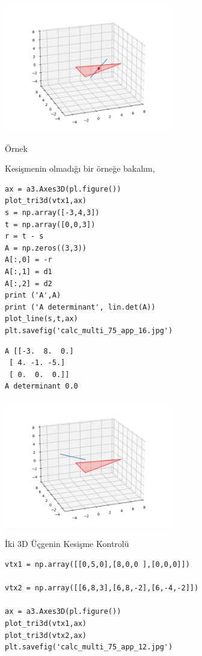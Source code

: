 \documentclass[12pt,fleqn]{article}\usepackage{../../common}
\begin{document}
\includegraphics[width=20em]{calc_multi_75_app_15.jpg}

Örnek

Kesişmenin olmadığı bir örneğe bakalım,

\begin{verbatim}
ax = a3.Axes3D(pl.figure())
plot_tri3d(vtx1,ax)
s = np.array([-3,4,3])
t = np.array([0,0,3])
r = t - s
A = np.zeros((3,3))
A[:,0] = -r
A[:,1] = d1
A[:,2] = d2
print ('A',A)
print ('A determinant', lin.det(A))
plot_line(s,t,ax)
plt.savefig('calc_multi_75_app_16.jpg')
\end{verbatim}

\begin{verbatim}
A [[-3.  8.  0.]
 [ 4. -1. -5.]
 [ 0.  0.  0.]]
A determinant 0.0
\end{verbatim}

\includegraphics[width=20em]{calc_multi_75_app_16.jpg}

















İki 3D Üçgenin Kesişme Kontrolü

\begin{verbatim}
vtx1 = np.array([[0,5,0],[8,0,0 ],[0,0,0]])

vtx2 = np.array([[6,8,3],[6,8,-2],[6,-4,-2]])

ax = a3.Axes3D(pl.figure())
plot_tri3d(vtx1,ax)
plot_tri3d(vtx2,ax)
plt.savefig('calc_multi_75_app_12.jpg')
\end{verbatim}
\end{document}
